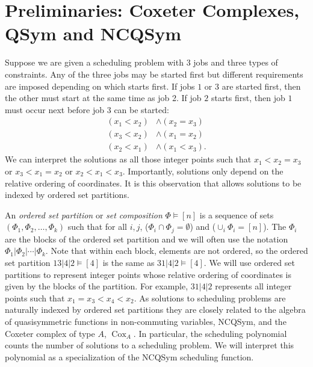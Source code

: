 \documentclass[12pt,reqno]{amsart}
\numberwithin{definition}{section}
\theoremstyle{definition}
\newcommand{\cox}{\operatorname{Cox}}
\begin{document}
\section{Preliminaries: Coxeter Complexes, QSym and NCQSym}
\label{ncqsym}


Suppose we are given a scheduling problem with $3$ jobs and three types
of constraints. Any of the three jobs may be started first but different
requirements are imposed depending on which starts first.  If jobs $1$ or $3$ are started first, then the other must start at the same time as job 2. If job $2$ starts first, then job $1$ must occur next before job $3$ can be started: 
\begin{align*}
(x_1 < x_2) &\wedge (x_2 = x_3)\\
(x_3 < x_2) &\wedge (x_1 = x_2)\\
(x_2 < x_1) &\wedge (x_1 < x_3).
\end{align*}
We can interpret the solutions as all those integer points such that
$x_1 < x_2 = x_3$ or $x_3 < x_1 = x_2$ or $x_2 < x_1 < x_3$.
Importantly, solutions only depend on the relative ordering of
coordinates.  It is this observation that allows solutions to be
indexed by ordered set partitions.



An \emph{ordered set partition} or \emph{set composition} $\Phi \vDash
[n]$ is a sequence of sets $(\Phi_1, \Phi_2, \ldots, \Phi_k)$ such
that for all $i,j$, ($ \Phi_i \cap \Phi_j = \emptyset$) and
($\cup_i \Phi_i = [n]$).  The $\Phi_i$ are the blocks of the ordered
set partition and we will often use the notation $\Phi_1| \Phi_2|
\cdots| \Phi_k$.  Note that within each block, elements are not
ordered, so the ordered set partition $13|4|2 \vDash [4]$ is the same
as $31|4|2 \vDash [4]$.  We will use ordered set partitions to represent integer
points whose relative ordering of coordinates is given by the blocks
of the partition.  For example, $31|4|2$ represents all integer points
such that $x_1 = x_3 < x_4 < x_2$.  As solutions to scheduling
problems are naturally indexed by ordered set partitions they are
closely related to the algebra of quasisymmetric functions in
non-commuting variables, NCQSym, and the Coxeter complex of type $A$,
$\cox_A$. In particular, the scheduling polynomial counts the number
of solutions to a scheduling problem.  We will interpret this
polynomial as a specialization of the NCQSym scheduling function.
\end{document}
